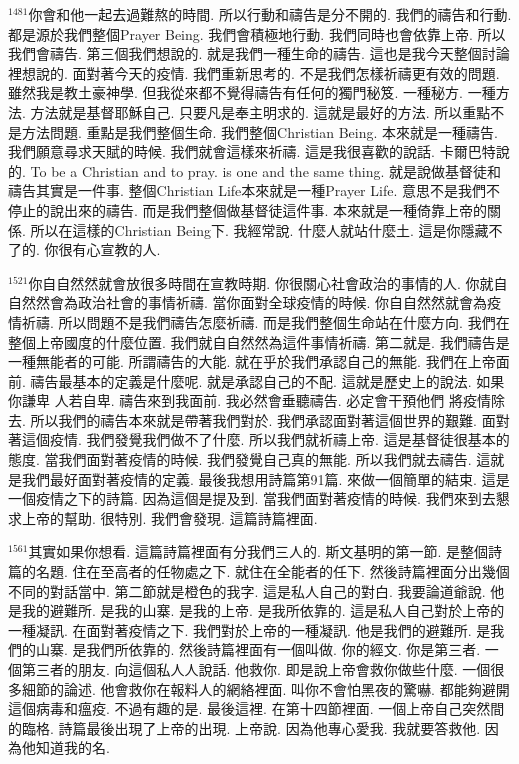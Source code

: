 \documentclass{book}
\begin{document}
$^{1481}$你會和他一起去過難熬的時間.
所以行動和禱告是分不開的.
我們的禱告和行動.
都是源於我們整個Prayer Being.
我們會積極地行動.
我們同時也會依靠上帝.
所以我們會禱告.
第三個我們想說的.
就是我們一種生命的禱告.
這也是我今天整個討論裡想說的.
面對著今天的疫情.
我們重新思考的.
不是我們怎樣祈禱更有效的問題.
雖然我是教土豪神學.
但我從來都不覺得禱告有任何的獨門秘笈.
一種秘方.
一種方法.
方法就是基督耶穌自己.
只要凡是奉主明求的.
這就是最好的方法.
所以重點不是方法問題.
重點是我們整個生命.
我們整個Christian Being.
本來就是一種禱告.
我們願意尋求天賦的時候.
我們就會這樣來祈禱.
這是我很喜歡的說話.
卡爾巴特說的.
To be a Christian and to pray.
is one and the same thing.
就是說做基督徒和禱告其實是一件事.
整個Christian Life本來就是一種Prayer Life.
意思不是我們不停止的說出來的禱告.
而是我們整個做基督徒這件事.
本來就是一種倚靠上帝的關係.
所以在這樣的Christian Being下.
我經常說.
什麼人就站什麼土.
這是你隱藏不了的.
你很有心宣教的人.

$^{1521}$你自自然然就會放很多時間在宣教時期.
你很關心社會政治的事情的人.
你就自自然然會為政治社會的事情祈禱.
當你面對全球疫情的時候.
你自自然然就會為疫情祈禱.
所以問題不是我們禱告怎麼祈禱.
而是我們整個生命站在什麼方向.
我們在整個上帝國度的什麼位置.
我們就自自然然為這件事情祈禱.
第二就是.
我們禱告是一種無能者的可能.
所謂禱告的大能.
就在乎於我們承認自己的無能.
我們在上帝面前.
禱告最基本的定義是什麼呢.
就是承認自己的不配.
這就是歷史上的說法.
如果你謙卑 人若自卑.
禱告來到我面前.
我必然會垂聽禱告.
必定會干預他們 將疫情除去.
所以我們的禱告本來就是帶著我們對於.
我們承認面對著這個世界的艱難.
面對著這個疫情.
我們發覺我們做不了什麼.
所以我們就祈禱上帝.
這是基督徒很基本的態度.
當我們面對著疫情的時候.
我們發覺自己真的無能.
所以我們就去禱告.
這就是我們最好面對著疫情的定義.
最後我想用詩篇第91篇.
來做一個簡單的結束.
這是一個疫情之下的詩篇.
因為這個是提及到.
當我們面對著疫情的時候.
我們來到去懇求上帝的幫助.
很特別.
我們會發現.
這篇詩篇裡面.

$^{1561}$其實如果你想看.
這篇詩篇裡面有分我們三人的.
斯文基明的第一節.
是整個詩篇的名題.
住在至高者的任物處之下.
就住在全能者的任下.
然後詩篇裡面分出幾個不同的對話當中.
第二節就是橙色的我字.
這是私人自己的對白.
我要論道爺說.
他是我的避難所.
是我的山寨.
是我的上帝.
是我所依靠的.
這是私人自己對於上帝的一種凝訊.
在面對著疫情之下.
我們對於上帝的一種凝訊.
他是我們的避難所.
是我們的山寨.
是我們所依靠的.
然後詩篇裡面有一個叫做.
你的經文.
你是第三者.
一個第三者的朋友.
向這個私人人說話.
他救你.
即是說上帝會救你做些什麼.
一個很多細節的論述.
他會救你在報料人的網絡裡面.
叫你不會怕黑夜的驚嚇.
都能夠避開這個病毒和瘟疫.
不過有趣的是.
最後這裡.
在第十四節裡面.
一個上帝自己突然間的臨格.
詩篇最後出現了上帝的出現.
上帝說.
因為他專心愛我.
我就要答救他.
因為他知道我的名.
\end{document}

